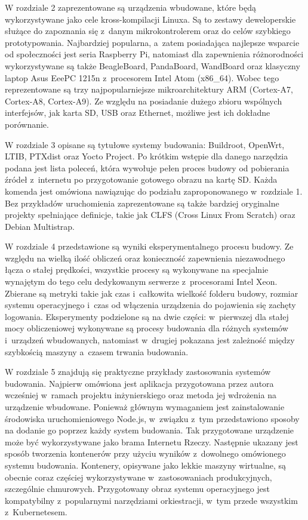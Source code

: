 \documentclass[printmode]{mgr}
\begin{document}
W rozdziale 2 zaprezentowane są urządzenia wbudowane, które będą wykorzystywane jako cele kross-kompilacji Linuxa.
Są to zestawy deweloperskie służące do zapoznania się z~danym mikrokontrolerem oraz do celów szybkiego prototypowania.
Najbardziej popularna, a~zatem posiadająca najlepsze wsparcie od społeczności jest seria Raspberry Pi, natomiast dla zapewnienia różnorodności wykorzystywane są także BeagleBoard, PandaBoard, WandBoard oraz klasyczny laptop Asus EeePC 1215n z~procesorem Intel Atom (x86\_64).
Wobec tego reprezentowane są trzy najpopularniejsze mikroarchitektury ARM (Cortex-A7, Cortex-A8, Cortex-A9).
Ze względu na posiadanie dużego zbioru wspólnych interfejsów, jak karta SD, USB oraz Ethernet, możliwe jest ich dokładne porównanie.

W rozdziale 3 opisane są tytułowe systemy budowania: Buildroot, OpenWrt, LTIB, PTXdist oraz Yocto Project.
Po krótkim wstępie dla danego narzędzia podana jest lista poleceń, która wywołuje pełen proces budowy od pobierania źródeł z~internetu po przygotowanie gotowego obrazu na kartę SD.
Każda komenda jest omówiona nawiązując do podziału zaproponowanego w~rozdziale 1.
Bez przykładów uruchomienia zaprezentowane są także bardziej oryginalne projekty spełniające definicje, takie jak CLFS (Cross Linux From Scratch) oraz Debian Multistrap.

W rozdziale 4 przedstawione są wyniki eksperymentalnego procesu budowy.
Ze względu na wielką ilość obliczeń oraz konieczność zapewnienia niezawodnego łącza o stałej prędkości, wszystkie procesy są wykonywane na specjalnie wynajętym do tego celu dedykowanym serwerze z~procesorami Intel Xeon.
Zbierane są metryki takie jak czas i~całkowita wielkość folderu budowy, rozmiar systemu operacyjnego i~czas od włączenia urządzenia do pojawienia się zachęty logowania.
Eksperymenty podzielone są na dwie części: w~pierwszej dla stałej mocy obliczeniowej wykonywane są procesy budowania dla różnych systemów i~urządzeń wbudowanych, natomiast w~drugiej pokazana jest zależność między szybkością maszyny a~czasem trwania budowania.

W rozdziale 5 znajdują się praktyczne przykłady zastosowania systemów budowania.
Najpierw omówiona jest aplikacja przygotowana przez autora wcześniej w~ramach projektu inżynierskiego oraz metoda jej wdrożenia na urządzenie wbudowane.
Ponieważ głównym wymaganiem jest zainstalowanie środowiska uruchomieniowego Node.js, w~związku z~tym przedstawiono sposoby na dodanie go poprzez każdy system budowania.
Tak przygotowane urządzenie może być wykorzystywane jako brama Internetu Rzeczy.
Następnie ukazany jest sposób tworzenia kontenerów przy użyciu wyników z~dowolnego omówionego systemu budowania.
Kontenery, opisywane jako lekkie maszyny wirtualne, są obecnie coraz częściej wykorzystywane w~zastosowaniach produkcyjnych, szczególnie chmurowych.
Przygotowany obraz systemu operacyjnego jest kompatybilny z~popularnymi narzędziami orkiestracji, w~tym przede wszystkim z~Kubernetesem.
\end{document}
